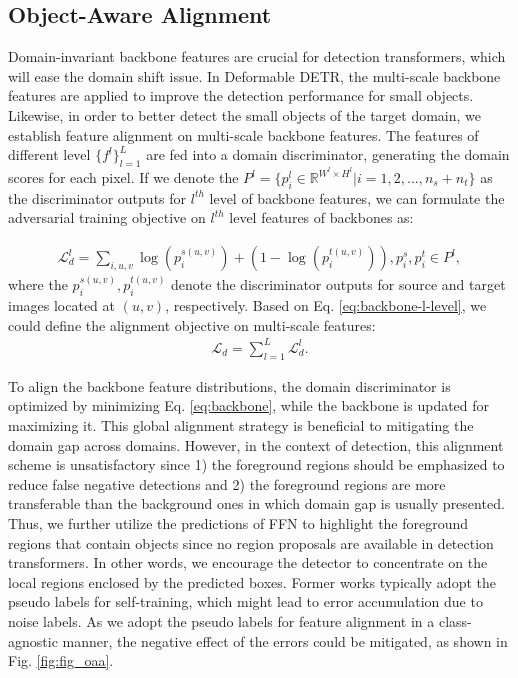 \documentclass[sigconf]{acmart}
\begin{document}
\subsection{Object-Aware Alignment}
Domain-invariant backbone features are crucial for detection transformers, which will ease the domain shift issue. In Deformable DETR, the multi-scale backbone features are applied to improve the detection performance for small objects. Likewise, in order to better detect the small objects of the target domain, we establish feature alignment on multi-scale backbone features. The features of different level $\{f^l\}_{l=1}^{L}$ are fed into a domain discriminator, generating the domain scores for each pixel.
 If we denote the $P^l=\{p^l_i \in \mathbb{R}^{W^l \times H^l} |i=1,2,...,n_s+n_t \}$ as the discriminator outputs for $l^{th}$ level of backbone features,  we can formulate the adversarial training objective on $l^{th}$ level features of backbones as:

\begin{align}
    \mathcal{L}_{d}^{l} = \mathop{\sum}_{i,u,v} \log (p_i^{s(u,v)}) + ( 1-  \log (p_i^{t(u,v)}) ), p_i^s,p_i^t \in P^l,
    \label{eq:backbone-l-level}
\end{align}where the $p_i^{s(u,v)}, p_i^{t(u,v)}$ denote the discriminator outputs for source and target images located at $(u,v)$, respectively. Based on Eq. \eqref{eq:backbone-l-level}, we could define the alignment objective on multi-scale features:
\begin{align}
    \mathcal{L}_{d} = \mathop{\sum}_{l=1}^{L} \mathcal{L}_d^l.
    \label{eq:backbone}
\end{align}

To align the backbone feature distributions, the domain discriminator is optimized by minimizing Eq. \eqref{eq:backbone}, while the backbone is updated for maximizing it. This global alignment strategy is beneficial to mitigating the domain gap across domains. However, in the context of detection, this alignment scheme is unsatisfactory since 1) the foreground regions should be emphasized to reduce false negative detections and 2) the foreground regions are more transferable than the background ones in which domain gap is usually presented. Thus, we further utilize the predictions of FFN to highlight the foreground regions that contain objects since no region proposals are available in detection transformers. In other words, we encourage the detector to concentrate on the local regions enclosed by the predicted boxes. Former works typically adopt the pseudo labels for self-training, which might lead to error accumulation due to noise labels. As we adopt the pseudo labels for feature alignment in a class-agnostic manner, the negative effect of the errors could be mitigated, as shown in Fig. \ref{fig:fig_oaa}.
\end{document}

